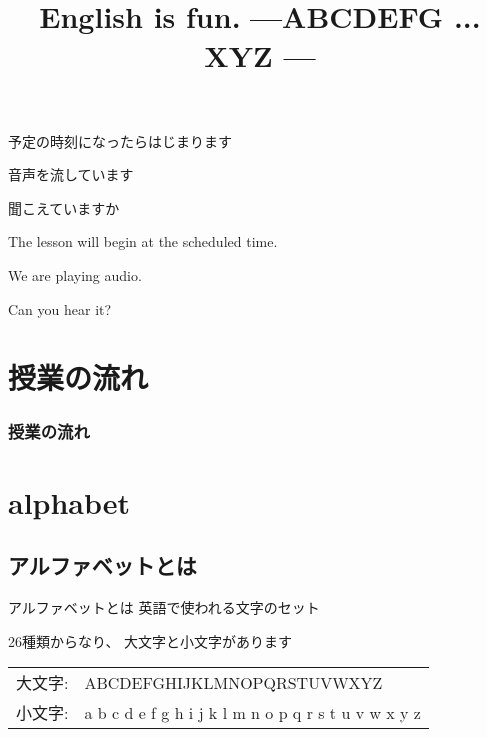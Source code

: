 \documentclass[aspectratio=169,xcolor={dvipsnames,table}]{beamer}
\title{English is fun.\,\,{}---ABCDEFG ... XYZ ---}
\author{}
\institute[]{}
\date[]
\begin{document}
\begin{frame}{}
\label{section}
\thispagestyle{empty}
\Large

\raggedright

予定の時刻になったらはじまります

\textbullet  音声を流しています

\textbullet  聞こえていますか　

\vfill

\raggedleft

The lesson will begin at the scheduled time.

\vspace{-6pt}

We are playing audio.

\vspace{-6pt}

Can you hear it?
\end{frame}

\begin{frame}
\label{section-1}
\thispagestyle{empty}
\titlepage
\end{frame}


\section*{授業の流れ}
\begin{frame}[plain]
  \frametitle{授業の流れ}
  \tableofcontents
\end{frame}

\section{alphabet}
\subsection{アルファベットとは}

\begin{frame}[plain]{アルファベットとは}
\Large
英語で使われる文字のセット\pause

\bigskip

26種類からなり、\pause
大文字と小文字があります\pause

\begin{rmfamily}
\begin{tabular}{lp{}}
大文字:& ABCDEFGHIJKLMNOPQRSTUVWXYZ\\\pause
小文字:& a b c d e f g h i j k l m n o p q r s t u v w x y z
\end{tabular}

\end{rmfamily}

\end{frame}
\end{document}
